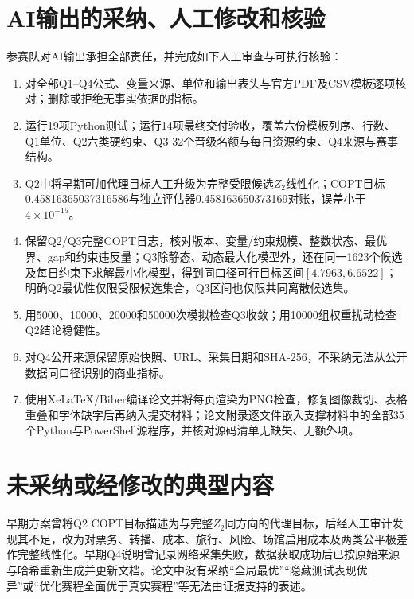 \documentclass[UTF8,a4paper,zihao=-4,fontset=fandol]{ctexart}
\begin{document}
\section{AI输出的采纳、人工修改和核验}
参赛队对AI输出承担全部责任，并完成如下人工审查与可执行核验：
\begin{enumerate}[label=\arabic*.]
  \item 对全部Q1--Q4公式、变量来源、单位和输出表头与官方PDF及CSV模板逐项核对；删除或拒绝无事实依据的指标。
  \item 运行19项Python测试；运行14项最终交付验收，覆盖六份模板列序、行数、Q1单位、Q2六类硬约束、Q3 32个晋级名额与每日资源约束、Q4来源与赛事结构。
  \item Q2中将早期可加代理目标人工升级为完整受限候选$Z_2$线性化；COPT目标0.45816365037316586与独立评估器0.458163650373169对账，误差小于$4\times10^{-15}$。
  \item 保留Q2/Q3完整COPT日志，核对版本、变量/约束规模、整数状态、最优界、gap和约束违反量；Q3除静态、动态最大化模型外，还在同一1623个候选及每日约束下求解最小化模型，得到同口径可行目标区间$[4.7963,6.6522]$；明确Q2最优性仅限受限候选集合，Q3区间也仅限共同离散候选集。
  \item 用5000、10000、20000和50000次模拟检查Q3收敛；用10000组权重扰动检查Q2结论稳健性。
  \item 对Q4公开来源保留原始快照、URL、采集日期和SHA-256，不采纳无法从公开数据同口径识别的商业指标。
  \item 使用XeLaTeX/Biber编译论文并将每页渲染为PNG检查，修复图像裁切、表格重叠和字体缺字后再纳入提交材料；论文附录逐文件嵌入支撑材料中的全部35个Python与PowerShell源程序，并核对源码清单无缺失、无额外项。
\end{enumerate}

\section{未采纳或经修改的典型内容}
早期方案曾将Q2 COPT目标描述为与完整$Z_2$同方向的代理目标，后经人工审计发现其不足，改为对票务、转播、成本、旅行、风险、场馆启用成本及两类公平极差作完整线性化。早期Q4说明曾记录网络采集失败，数据获取成功后已按原始来源与哈希重新生成并更新文档。论文中没有采纳“全局最优”“隐藏测试表现优异”或“优化赛程全面优于真实赛程”等无法由证据支持的表述。
\end{document}
